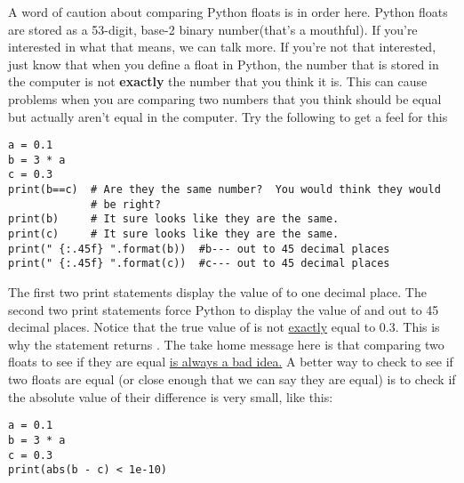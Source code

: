 A word of caution about comparing Python floats is in order here.
Python floats are stored as a 53-digit, base-2 binary number(that's a
mouthful).  If you're interested in what that means, we can talk more.
If you're not that interested, just know that when you define a float
in Python, the number that is stored in the computer is not
\textbf{exactly} the number that you think it is.  This can cause
problems when you are comparing two numbers that you think should be
equal but actually aren't equal in the computer.   Try the following to get a feel for this
\begin{Verbatim}
a = 0.1
b = 3 * a
c = 0.3
print(b==c)  # Are they the same number?  You would think they would
             # be right?
print(b)     # It sure looks like they are the same.
print(c)     # It sure looks like they are the same.
print(" {:.45f} ".format(b))  #b--- out to 45 decimal places
print(" {:.45f} ".format(c))  #c--- out to 45 decimal places
\end{Verbatim}
The first two print statements display the value of  to one
decimal place. The second two print statements force Python
to display the value of  and  out to 45 decimal
places.  Notice that the true value of  is not \ul{exactly}
equal to 0.3.  This is why the statement  returns
. The take home message here is that comparing two floats
to see if they are equal \ul{is always a bad idea.}  A better way to
check to see if two floats are equal (or close enough that we can say
they are equal) is to check if the absolute value of their difference
is very small, like this:
\begin{Verbatim}
a = 0.1
b = 3 * a
c = 0.3
print(abs(b - c) < 1e-10)
\end{Verbatim}

